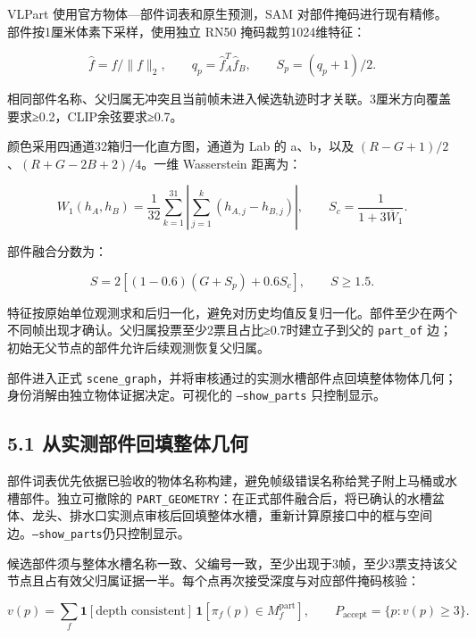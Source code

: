 \documentclass[UTF8,fontset=fandol]{ctexart}
\begin{document}
VLPart 使用官方物体—部件词表和原生预测，SAM 对部件掩码进行现有精修。部件按1厘米体素下采样，使用独立 RN50 掩码裁剪1024维特征：



\[
\hat f=f/\|f\|_2,\qquad q_p=\hat f_A^T\hat f_B,\qquad S_p=(q_p+1)/2.
\]

相同部件名称、父归属无冲突且当前帧未进入候选轨迹时才关联。3厘米方向覆盖要求≥0.2，CLIP余弦要求≥0.7。



颜色采用四通道32箱归一化直方图，通道为 Lab 的 a、b，以及 $(R-G+1)/2$、$(R+G-2B+2)/4$。一维 Wasserstein 距离为：



\[
W_1(h_A,h_B)=\frac1{32}\sum_{k=1}^{31}
\left|\sum_{j=1}^{k}(h_{A,j}-h_{B,j})\right|,
\qquad S_c=\frac1{1+3\overline W_1}.
\]

部件融合分数为：



\[
S=2\left[(1-0.6)(G+S_p)+0.6S_c\right],\qquad S\ge1.5.
\]

特征按原始单位观测求和后归一化，避免对历史均值反复归一化。部件至少在两个不同帧出现才确认。父归属投票至少2票且占比≥0.7时建立子到父的 \texttt{part\_\allowbreak{}of} 边；初始无父节点的部件允许后续观测恢复父归属。



部件进入正式 \texttt{scene\_\allowbreak{}graph}，并将审核通过的实测水槽部件点回填整体物体几何；身份消解由独立物体证据决定。可视化的 \texttt{--show\_\allowbreak{}parts} 只控制显示。



\subsection*{5.1 从实测部件回填整体几何}

部件词表优先依据已验收的物体名称构建，避免帧级错误名称给凳子附上马桶或水槽部件。独立可撤除的 \texttt{PART\_\allowbreak{}GEOMETRY}：在正式部件融合后，将已确认的水槽盆体、龙头、排水口实测点审核后回填整体水槽，重新计算原接口中的框与空间边。\texttt{--show\_\allowbreak{}parts}仍只控制显示。



候选部件须与整体水槽名称一致、父编号一致，至少出现于3帧，至少3票支持该父节点且占有效父归属证据一半。每个点再次接受深度与对应部件掩码核验：



\[
v(p)=\sum_f\mathbf1[\text{depth consistent}]\,
\mathbf1[\pi_f(p)\in M_f^{\mathrm{part}}],\qquad
P_{\mathrm{accept}}=\{p:v(p)\ge3\}.
\]
\end{document}
